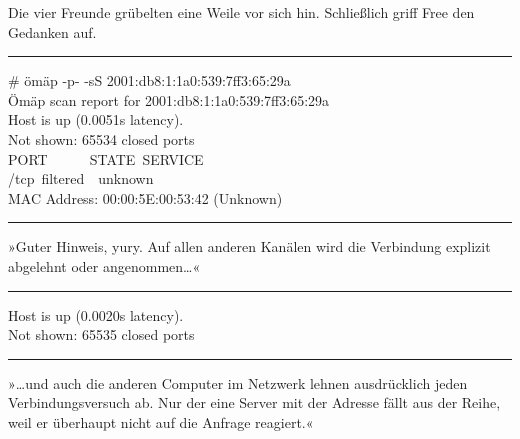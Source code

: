 Die vier Freunde grübelten eine Weile vor sich hin. Schließlich griff Free den Gedanken auf.

\noindent \parbox{\textwidth}{ \vspace{3ex} \hrule \vspace{3ex}

    \begin{tiny}
    \begin{ttfamily}

\noindent \# ömäp -p- -sS 2001:db8:1:1a0:539:7ff3:65:29a\\
\noindent Ömäp scan report for 2001:db8:1:1a0:539:7ff3:65:29a\\
\noindent Host is up (0.0051s latency).\\
\noindent Not shown: 65534 closed ports\\
\noindent PORT~~~~~~STATE~SERVICE\\
/tcp~filtered~~unknown\\
\noindent MAC Address: 00:00:5E:00:53:42 (Unknown)

    \end{ttfamily}
    \end{tiny}

\vspace{3ex} \hrule \vspace{3ex} }

»Guter Hinweis, yury. Auf allen anderen Kanälen wird die Verbindung explizit abgelehnt oder angenommen…«

\noindent \parbox{\textwidth}{ \vspace{3ex} \hrule \vspace{3ex}

    \begin{tiny}
    \begin{ttfamily}

\noindent Host is up (0.0020s latency).\\
\noindent Not shown: 65535 closed ports

    \end{ttfamily}
    \end{tiny}

\vspace{3ex} \hrule \vspace{3ex} }

»…und auch die anderen Computer im Netzwerk lehnen ausdrücklich jeden Verbindungsversuch ab. Nur der eine Server mit der Adresse  fällt aus der Reihe, weil er überhaupt nicht auf die Anfrage reagiert.«

